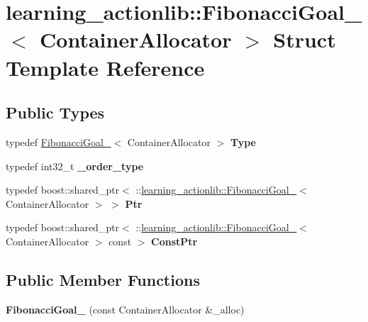 \hypertarget{structlearning__actionlib_1_1FibonacciGoal__}{}\section{learning\+\_\+actionlib\+:\+:Fibonacci\+Goal\+\_\+$<$ Container\+Allocator $>$ Struct Template Reference}
\label{structlearning__actionlib_1_1FibonacciGoal__}
\subsection*{Public Types}
\begin{DoxyCompactItemize}
\item 
\mbox{\label{structlearning__actionlib_1_1FibonacciGoal___a01bda738dddca30a1bc9938aa9d12992}} 
typedef \hyperlink{structlearning__actionlib_1_1FibonacciGoal__}{Fibonacci\+Goal\+\_\+}$<$ Container\+Allocator $>$ {\bfseries Type}
\item 
\mbox{\label{structlearning__actionlib_1_1FibonacciGoal___a09ee857464a8a06f49c5d4d1996e7b1a}} 
typedef int32\+\_\+t {\bfseries \+\_\+order\+\_\+type}
\item 
\mbox{\label{structlearning__actionlib_1_1FibonacciGoal___aec350a75d7d2a3aa9a5caf135b0be50d}} 
typedef boost\+::shared\+\_\+ptr$<$ \+::\hyperlink{structlearning__actionlib_1_1FibonacciGoal__}{learning\+\_\+actionlib\+::\+Fibonacci\+Goal\+\_\+}$<$ Container\+Allocator $>$ $>$ {\bfseries Ptr}
\item 
\mbox{\label{structlearning__actionlib_1_1FibonacciGoal___a8578f4a51edf0b6212ffc54ed026b9d1}} 
typedef boost\+::shared\+\_\+ptr$<$ \+::\hyperlink{structlearning__actionlib_1_1FibonacciGoal__}{learning\+\_\+actionlib\+::\+Fibonacci\+Goal\+\_\+}$<$ Container\+Allocator $>$ const  $>$ {\bfseries Const\+Ptr}
\end{DoxyCompactItemize}
\subsection*{Public Member Functions}
\begin{DoxyCompactItemize}
\item 
\mbox{\label{structlearning__actionlib_1_1FibonacciGoal___a95ad28a8b98c41c961354396cec4c47d}} 
{\bfseries Fibonacci\+Goal\+\_\+} (const Container\+Allocator \&\+\_\+alloc)
\end{DoxyCompactItemize}
